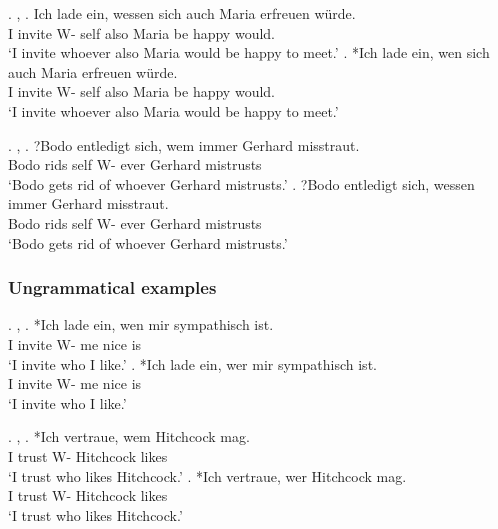 \ex. , 
\ag. Ich {lade ein}, wessen sich auch Maria erfreuen würde.\\
 I invite\scsub{[acc]} W- self also Maria {be happy}\scsub{[gen]} would.\\
 `I invite whoever also Maria would be happy to meet.' \hfill \citep[344]{vogel2001}
\bg. *Ich {lade ein}, wen sich auch Maria erfreuen würde.\\
 I invite\scsub{[acc]} W- self also Maria {be happy}\scsub{[gen]} would.\\
 `I invite whoever also Maria would be happy to meet.' \hfill \citep[344]{vogel2001}

\ex. , 
\ag. ?Bodo entledigt sich, wem immer Gerhard misstraut.\\
 Bodo rids\scsub{[gen]} self W- ever Gerhard mistrusts\\
 `Bodo gets rid of whoever Gerhard mistrusts.' \hfill \citep[345]{vogel2001}
\bg. ?Bodo entledigt sich, wessen immer Gerhard misstraut.\\
 Bodo rids\scsub{[gen]} self W- ever Gerhard mistrusts\\
 `Bodo gets rid of whoever Gerhard mistrusts.' \hfill \citep[345]{vogel2001}


\subsubsection{Ungrammatical examples}

\ex. , 
\ag. *Ich {lade ein}, wen mir sympathisch ist.\\
 I invite\scsub{[acc]} W- me nice is\\
 `I invite who I like.' \hfill \citep[344]{vogel2001}
\bg. *Ich {lade ein}, wer mir sympathisch ist.\\
 I invite\scsub{[acc]} W- me nice is\\
 `I invite who I like.' \hfill \citep[344]{vogel2001}

\ex. , 
\ag. *Ich vertraue, wem Hitchcock mag.\\
 I trust\scsub{[dat]} W- Hitchcock likes\\
 `I trust who likes Hitchcock.' \hfill \citep[345]{vogel2001}
\bg. *Ich vertraue, wer Hitchcock mag.\\
 I trust\scsub{[dat]} W- Hitchcock likes\\
 `I trust who likes Hitchcock.' \hfill \citep[345]{vogel2001}

